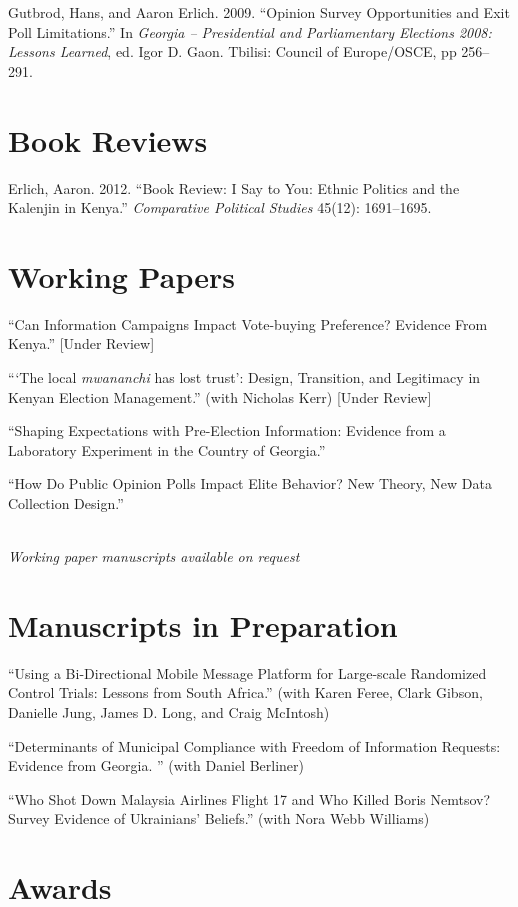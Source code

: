 \documentclass[margin,line]{res}
\begin{document}
{\begin{resume}
Gutbrod, Hans, and Aaron Erlich. 2009. ``Opinion Survey Opportunities and Exit Poll
Limitations.'' In \emph{Georgia -- Presidential and Parliamentary
  Elections 2008: Lessons Learned}, ed. Igor D. Gaon. Tbilisi: Council
of Europe/OSCE, pp 256--291.
 
\section{\sc Book Reviews}
Erlich, Aaron. 2012. ``Book Review: I Say to You: Ethnic Politics and the Kalenjin in Kenya.'' \emph{Comparative Political Studies} 45(12): 1691--1695.

\section{\sc Working Papers}
``Can Information Campaigns Impact Vote-buying Preference? Evidence
From Kenya.'' [Under Review]

``‘The local \emph{mwananchi} has lost trust’: Design, Transition, and Legitimacy in Kenyan Election Management.'' (with Nicholas Kerr) [Under Review]

``Shaping Expectations with Pre-Election Information:
Evidence from a Laboratory Experiment in the Country of Georgia.''

``How Do Public Opinion Polls Impact Elite Behavior? New Theory, New Data Collection Design.''
\\
\\
\centerline{\emph{Working paper manuscripts available on request}}


\section{\sc Manuscripts in Preparation}
``Using a Bi-Directional Mobile Message Platform for Large-scale
Randomized Control Trials: Lessons from South Africa.'' (with Karen
Feree, Clark Gibson, Danielle
Jung, James D. Long, and Craig McIntosh)

``Determinants of Municipal Compliance with Freedom of Information
Requests: Evidence from Georgia. '' (with Daniel Berliner)

``Who Shot Down Malaysia Airlines Flight 17 and Who Killed Boris Nemtsov?  Survey
Evidence of Ukrainians' Beliefs.'' (with Nora Webb Williams)

\section{\sc Awards} 


\end{resume}}
\end{document}
